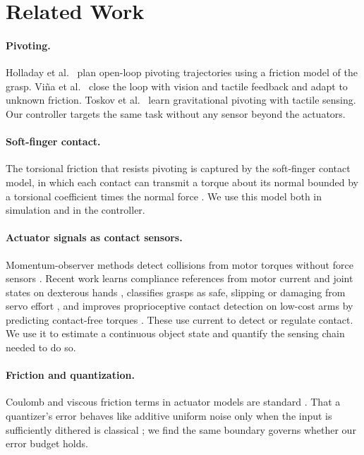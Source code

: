\documentclass[11pt]{article}
\begin{document}
\section{Related Work}
\paragraph{Pivoting.} Holladay et al.\ \cite{holladay2015} plan open-loop pivoting trajectories using a friction model of the grasp. Vi\~na et al.\ \cite{vina2016} close the loop with vision and tactile feedback and adapt to unknown friction. Toskov et al.\ \cite{toskov2023} learn gravitational pivoting with tactile sensing. Our controller targets the same task without any sensor beyond the actuators.

\paragraph{Soft-finger contact.} The torsional friction that resists pivoting is captured by the soft-finger contact model, in which each contact can transmit a torque about its normal bounded by a torsional coefficient times the normal force \cite{xydas1999}. We use this model both in simulation and in the controller.

\paragraph{Actuator signals as contact sensors.} Momentum-observer methods detect collisions from motor torques without force sensors \cite{deluca2005}. Recent work learns compliance references from motor current and joint states on dexterous hands \cite{ma2026}, classifies grasps as safe, slipping or damaging from servo effort \cite{shuto2026}, and improves proprioceptive contact detection on low-cost arms by predicting contact-free torques \cite{zhu2026}. These use current to detect or regulate contact. We use it to estimate a continuous object state and quantify the sensing chain needed to do so.

\paragraph{Friction and quantization.} Coulomb and viscous friction terms in actuator models are standard \cite{armstrong1994}. That a quantizer's error behaves like additive uniform noise only when the input is sufficiently dithered is classical \cite{gray1993}; we find the same boundary governs whether our error budget holds.
\end{document}

